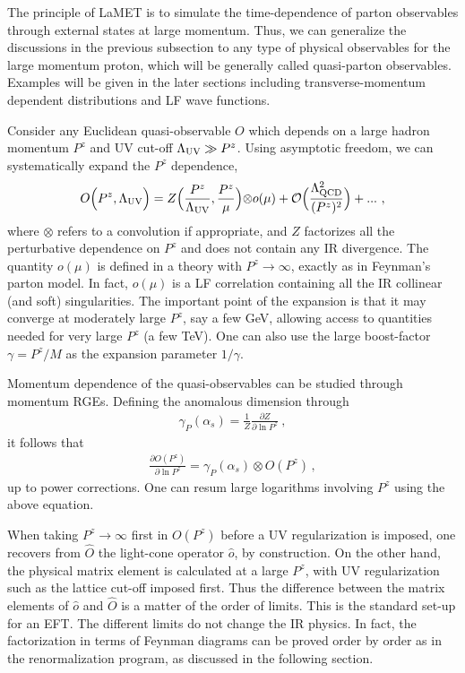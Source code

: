 \documentclass[aps,rmp,reprint,amsmath,amssymb,graphicx,longbibliography]{revtex4-1} %
\begin{document}
The principle of LaMET is to simulate the time-dependence of parton observables through external states at large momentum.
Thus, we can generalize the discussions in the previous subsection
to any type of physical observables for the large momentum
proton, which will be generally called quasi-parton observables.
Examples will be given in the later sections including
transverse-momentum dependent distributions and LF wave functions.

Consider any Euclidean quasi-observable $O$ which depends
on a large hadron momentum $P^z$
and UV cut-off $\Lambda_{\rm UV}\gg P^z$.
Using asymptotic freedom, we can systematically
expand the $P^z$ dependence,
\begin{align}
	O\Big(P^z,\Lambda_{\rm UV}\Big) = Z\Big({P^z\over\Lambda_{\rm UV}},
	{P^z\over \mu}\Big){\otimes}o(\mu) + {\cal O}\Big({\Lambda_{\rm QCD}^2\over (P^z)^2}\Big)+ ... \ ,
	\label{eq:Expansion}
\end{align}
where $\otimes$ refers to a convolution if appropriate, and $Z$ factorizes all the perturbative
dependence on $P^z$ and does not contain any IR divergence.
The quantity $o(\mu)$ is defined in a theory with $P^z\rightarrow \infty$, exactly
as in Feynman's parton model. In fact, $o(\mu)$ is a LF
correlation containing all the IR collinear (and soft)
singularities. The important point of the expansion is that it
may converge at moderately large $P^z$, say a few GeV, allowing
access to quantities needed for very large $P^z$ (a few TeV).
One can also use the large boost-factor $\gamma=P^z/M$ as the expansion
parameter $1/\gamma$.

Momentum dependence of the quasi-observables can be
studied through momentum RGEs. Defining the anomalous dimension through
\begin{align}
	\gamma_P(\alpha_s) = \frac{1}{Z}\frac{\partial Z}{\partial \ln P^z} \ ,
\end{align}
it follows{ that}
\begin{align}
	\frac{\partial O(P^z)}{\partial \ln P^z} = \gamma_P(\alpha_s) \otimes O(P^z) \,,
\end{align}
up to power corrections. One can resum large logarithms involving $P^z$ using the above equation.

When taking $P^z\rightarrow \infty$ first
in $O(P^z)$ before a UV regularization is imposed, one recovers from $\hat O$ the
light-cone operator $\hat o$, by construction. On the other hand, the physical matrix
element is calculated at a large $P^z$, with UV regularization such as the lattice cut-off
imposed first. Thus the difference between the matrix elements of $\hat o$ and $\hat O$ is a matter of
the order of limits. This is the standard set-up for an EFT. The different limits do
not change the IR physics. In fact, the factorization in terms of Feynman diagrams
can be proved order by order as in the renormalization program, as discussed in the
following section.
\end{document}
